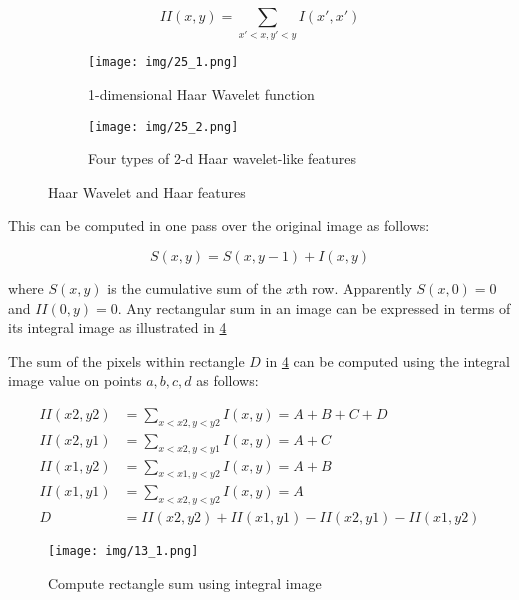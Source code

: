 \documentclass[12pt, twoside]{report}
\begin{document}
	\begin{equation}
		II(x, y) = \sum_{x' < x, y' < y}{I(x' , x')}
	\end{equation}

	\newpage
	\begin{figure}[h!]
		\centering
		\begin{subfigure}{0.5\textwidth}
		\centering
		\texttt{[image: img/25\_1.png]}
		\caption{1-dimensional Haar Wavelet function}
		\label{fig:25_sub1}
		\end{subfigure}%
		\begin{subfigure}{0.5\textwidth}
		\centering
		\texttt{[image: img/25\_2.png]}
		\caption{Four types of 2-d Haar wavelet-like features}
		\label{fig:25_sub2}
		\end{subfigure}
		\caption{Haar Wavelet and Haar features}
		\label{fig:25}
	\end{figure}

	\par
	This can be computed in one pass over the original image as follows:

	\begin{equation}
		S(x, y) = S(x, y - 1) + I(x, y)
	\end{equation}

	where $S(x, y)$ is the cumulative sum of the $x$th row. Apparently $S(x, 0) = 0$ and $II(0, y) = 0$. Any rectangular sum in an image can be expressed in terms of its integral image as illustrated in \ref{fig:29}

	\par
	The sum of the pixels within rectangle $D$ in \ref{fig:29} can be computed using the integral image value on points $a, b, c, d$ as follows:

	\begin{align}
		II(x2, y2) &= \sum_{x<x2, y<y2}{I(x, y)} = A + B + C + D \\
		II(x2, y1) &= \sum_{x<x2, y<y1}{I(x, y)} = A + C \\
		II(x1, y2) &= \sum_{x<x1, y<y2}{I(x, y)} = A + B \\
		II(x1, y1) &= \sum_{x<x2, y<y2}{I(x, y)} = A \\
		D &= II(x2, y2) + II(x1, y1) - II(x2, y1) - II(x1, y2)
	\end{align}

	\newpage
	\begin{figure}
		\centering
		\texttt{[image: img/13\_1.png]}
		\caption{Compute rectangle sum using integral image}
		\label{fig:29}
	\end{figure}
	
\end{document}
